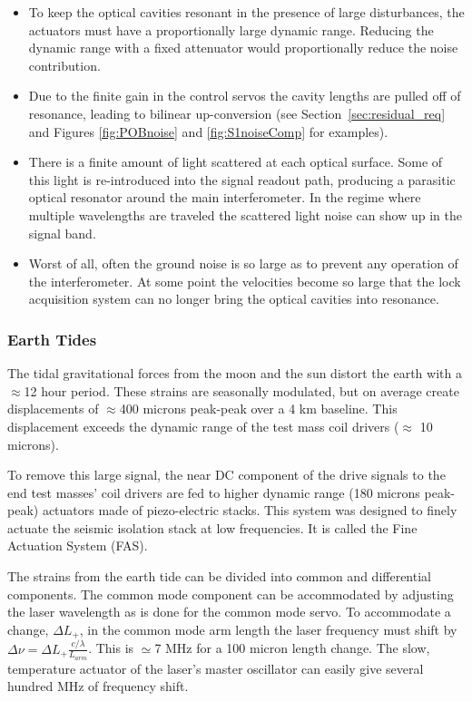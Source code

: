 \begin{itemize}
 \item To keep the optical cavities resonant in the presence of large
   disturbances, the actuators must have a proportionally large dynamic
   range. Reducing the dynamic range with a fixed attenuator would proportionally
   reduce the noise contribution.

\item Due to the finite gain in the control servos the cavity lengths are pulled
   off of resonance, leading to bilinear up-conversion (see 
   Section~\ref{sec:residual_req} and Figures \ref{fig:POBnoise} 
   and \ref{fig:S1noiseComp} for examples).

\item There is a finite amount of light scattered at each optical surface. Some of
   this light is re-introduced into the signal readout path, producing a
   parasitic optical resonator around the main interferometer. In the regime
   where multiple wavelengths are traveled the scattered light noise can
   show up in the signal band.

\item Worst of all, often the ground noise is so large as to prevent any
   operation of the interferometer. At some point the velocities become so
   large that the lock acquisition system can no longer bring the optical
   cavities into resonance.
\end{itemize}


\subsubsection{Earth Tides}

The tidal gravitational forces from the moon and the sun distort the 
earth with a $\approx$12 hour period. These strains are
seasonally modulated, but on average create displacements of $\approx$400 
microns peak-peak over a 4 km baseline. This displacement exceeds 
the dynamic range of the test mass coil drivers ($\approx$ 10 microns).

To remove this large signal, the near DC component of the drive signals to the
end test masses' coil drivers are fed to higher dynamic range 
(180 microns peak-peak) actuators made of piezo-electric stacks. 
This system was designed to finely actuate the seismic isolation stack
at low frequencies. It is called the Fine Actuation System (FAS).

The strains from the earth tide can be divided into common and differential 
components. The common mode component can be accommodated by adjusting the 
laser wavelength as is done for the common mode servo. To accommodate 
a change, $\Delta L_{+}$, in the common mode arm length the laser 
frequency must shift by  
$\Delta \nu = \Delta L_{+} \frac{c/\lambda}{L_{arm}}$. 
This is $\simeq$7 MHz for a 100 micron length change. The slow, 
temperature actuator of the laser's master oscillator can easily give several 
hundred MHz of frequency shift.

